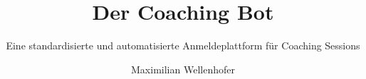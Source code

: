 \documentclass[envcountsame, envcountchap, deutsch]{i-studis} %
\begin{document}
\title{Der Coaching Bot}
\subtitle{Eine standardisierte und automatisierte Anmeldeplattform für Coaching Sessions}

\author{Maximilian Wellenhofer}


\address{Zürich}


\mytitlepage

\frontmatter
\tableofcontents										%
\listoffigures											%
\listoftables											%


\mainmatter











\backmatter
\printindex												%


\begin{appendix}
\end{appendix}
\end{document}
